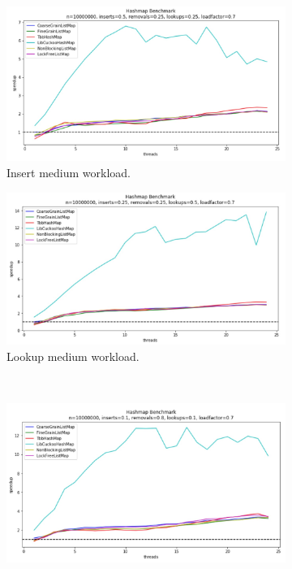 \documentclass[11pt]{article}
\begin{document}
\begin{figure}[h]
\begin{subfigure}{.5\textwidth}
  \centering
  \includegraphics[width=1.0\linewidth]{figs/patricio/latedays/inserts_medium.jpg}
  \caption{Insert medium workload.}
  \label{fig:mapInsertMedium}
\end{subfigure}%
\hspace*{\fill}
\begin{subfigure}{.5\textwidth}
  \centering
  \includegraphics[width=1.0\linewidth]{figs/patricio/latedays/lookups_medium.jpg}
  \caption{Lookup medium workload.}
  \label{fig:mapLookupMedium}
\end{subfigure}
\\ %
\begin{subfigure}{0.5\textwidth}
  \centering
  \includegraphics[width=1.0\linewidth]{figs/patricio/latedays/removals_heavy.jpg}

\end{subfigure}
\end{figure}
\end{document}
